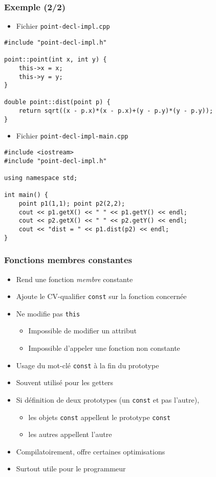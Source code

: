 \begin{frame}[containsverbatim]
\frametitle{Exemple (2/2)}
\begin{itemize}
\item Fichier \texttt{point-decl-impl.cpp}
\end{itemize}
\begin{lstlisting}
#include "point-decl-impl.h"

point::point(int x, int y) {
    this->x = x;
    this->y = y;
}

double point::dist(point p) {
    return sqrt((x - p.x)*(x - p.x)+(y - p.y)*(y - p.y));
}
\end{lstlisting}
\begin{itemize}
\item Fichier \texttt{point-decl-impl-main.cpp}
\end{itemize}
\begin{lstlisting}
#include <iostream>
#include "point-decl-impl.h"

using namespace std;

int main() {
	point p1(1,1); point p2(2,2);
	cout << p1.getX() << " " << p1.getY() << endl;	
	cout << p2.getX() << " " << p2.getY() << endl;
	cout << "dist = " << p1.dist(p2) << endl;
}
\end{lstlisting}
\end{frame}

\begin{frame}
\frametitle{Fonctions membres constantes}
\begin{itemize}[<+->]
\item Rend une fonction \emph{membre} constante
\item Ajoute le CV-qualifier \lstinline|const| sur la fonction concernée
\item Ne modifie pas \lstinline|this|
	\begin{itemize}
	\item Impossible de modifier un attribut
	\item Impossible d'appeler une fonction non constante
	\end{itemize}
\item Usage du mot-clé \lstinline|const| à la fin du prototype
\item Souvent utilisé pour les getters
\item Si définition de deux prototypes (un \lstinline|const| et pas l'autre),
	\begin{itemize}
	\item les objets \lstinline|const| appellent le prototype \lstinline|const|
	\item les autres appellent l'autre
	\end{itemize}
\item Compilatoirement, offre certaines optimisations
\item Surtout utile pour le programmeur
\end{itemize}
\end{frame}

